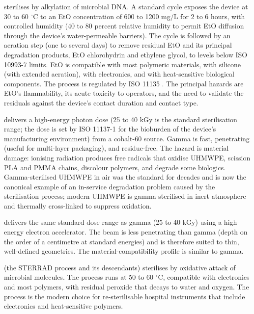  sterilises by alkylation of microbial
DNA. A standard cycle exposes the device at 30 to 60 $^{\circ}$C
to an EtO concentration of 600 to 1200 mg/L for 2 to 6 hours, with
controlled humidity (40 to 80 percent relative humidity to permit
EtO diffusion through the device's water-permeable barriers). The
cycle is followed by an aeration step (one to several days) to
remove residual EtO and its principal degradation products, EtO
chlorohydrin and ethylene glycol, to levels below ISO 10993-7
limits. EtO is compatible with most polymeric materials, with
silicone (with extended aeration), with electronics, and with
heat-sensitive biological components. The process is regulated by
ISO 11135 \cite{std:v6c12-iso-11135-2014}. The principal hazards
are EtO's flammability, its acute toxicity to operators, and the
need to validate the residuals against the device's contact
duration and contact type.

 delivers a high-energy photon dose
(25 to 40 kGy is the standard sterilisation range; the dose is set
by ISO 11137-1 for the bioburden of the device's manufacturing
environment) from a cobalt-60 source. Gamma is fast, penetrating
(useful for multi-layer packaging), and residue-free. The hazard is
material damage: ionising radiation produces free radicals that
oxidise UHMWPE, scission PLA and PMMA chains, discolour polymers,
and degrade some biologics. Gamma-sterilised UHMWPE in air was the
standard for decades and is now the canonical example of an
in-service degradation problem caused by the sterilisation
process; modern UHMWPE is gamma-sterilised in inert atmosphere and
thermally cross-linked to suppress oxidation.

 delivers the same standard
dose range as gamma (25 to 40 kGy) using a high-energy electron
accelerator. The beam is less penetrating than gamma (depth on the
order of a centimetre at standard energies) and is therefore
suited to thin, well-defined geometries. The material-compatibility
profile is similar to gamma.

 (the STERRAD process and
its descendants) sterilises by oxidative attack of microbial
molecules. The process runs at 50 to 60 $^{\circ}$C, compatible
with electronics and most polymers, with residual peroxide that
decays to water and oxygen. The process is the modern choice for
re-sterilisable hospital instruments that include electronics and
heat-sensitive polymers.

